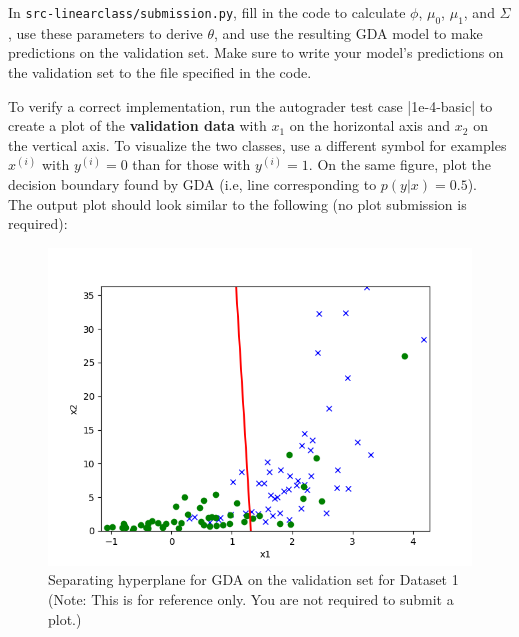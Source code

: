 \item {}
In \texttt{src-linearclass/submission.py}, fill in the code to calculate $\phi$, $\mu_{0}$, $\mu_{1}$, and $\Sigma$, use these parameters to derive $\theta$, and use the resulting GDA model to make predictions on the validation set. Make sure to write your model's predictions on the validation set to the file specified in the code.

To verify a correct implementation, run the autograder test case |1e-4-basic| to create a plot of the \textbf{validation data} with $x_1$ on the horizontal axis and $x_2$ on the vertical axis. To visualize the two classes, use a different symbol for examples $x^{(i)}$ with $y^{(i)} = 0$ than for those with $y^{(i)} = 1$. On the same figure, plot the decision boundary found by GDA (i.e, line corresponding to $p(y\vert x) = 0.5$).\\

The output plot should look similar to the following (no plot submission is required): 

\begin{figure}[H]
	\centering
	\vspace{2mm}
	\includegraphics[width=0.65\linewidth]{01-linearclass/p01e_pred_1.png}
    \caption{Separating hyperplane for GDA on the validation set for Dataset 1 (Note: This is for reference only.  You are not required to submit a plot.)}
\end{figure}
